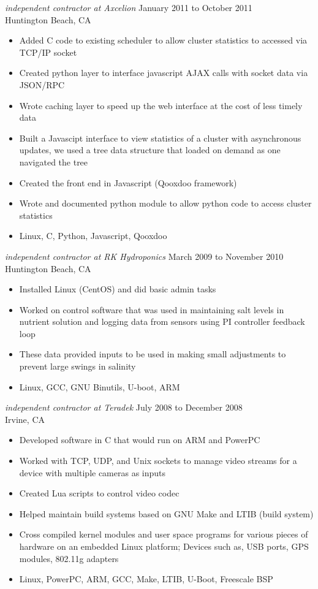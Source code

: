 \documentclass{res}
\begin{document}
\begin{resume}
{\sl independent contractor at Axcelion} \hfill January 2011 to October 2011\\
Huntington Beach, CA 
\begin{itemize}
\item Added  C code to existing scheduler to allow cluster statistics to
accessed via TCP/IP socket
\item Created python layer to interface javascript AJAX calls with
socket data via JSON/RPC
\item Wrote caching layer to speed up the web interface at the cost of
less timely data
\item Built a Javascipt interface to view statistics of a cluster with
asynchronous updates, we used a tree data structure that loaded on
demand as one navigated the tree
\item Created the front end in Javascript (Qooxdoo framework)
\item Wrote and documented python module to allow python code to
access cluster statistics
\item Linux, C, Python, Javascript, Qooxdoo
\end{itemize}

{\sl independent contractor at RK Hydroponics} \hfill March 2009 to November 2010\\
Huntington Beach, CA 
\begin{itemize}
\item Installed Linux (CentOS) and did basic admin tasks
\item Worked on control software that was used in maintaining salt
levels in nutrient solution and logging data from sensors using PI controller
feedback loop
\item These data provided inputs to be used in making small adjustments
to prevent large swings in salinity
\item Linux, GCC, GNU Binutils, U-boot, ARM
\end{itemize}


{\sl independent contractor at Teradek} \hfill July 2008 to December 2008\\
Irvine, CA
\begin{itemize}
\item Developed software in C that would run on ARM and PowerPC
\item Worked with TCP, UDP, and Unix sockets to manage video streams for
a device with multiple cameras as inputs
\item Created Lua scripts to control video codec
\item Helped maintain build systems based on GNU Make and LTIB (build system)
\item Cross compiled kernel modules and user space programs for various
pieces of hardware on an embedded Linux platform; Devices such as, USB
ports, GPS modules, 802.11g adapters
\item  Linux, PowerPC, ARM, GCC, Make, LTIB, U-Boot, Freescale BSP
\end{itemize}


\end{resume}
\end{document}
